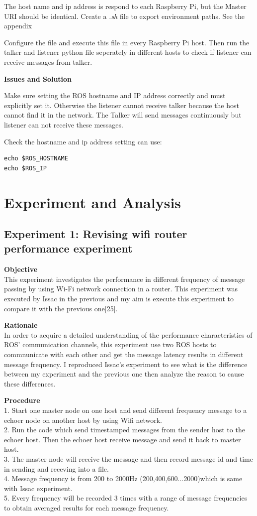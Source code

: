 \documentclass{mproj}
\begin{document}
The host name and ip address is respond to each Raspberry Pi, but the Master URI should be identical. Create a  \textit{.sh} file to export environment paths. See the appendix

Configure the file and execute this file in every Raspberry Pi host. Then run the talker and listener python file seperately in different hosts to check if listener can receive messages from talker.

\textbf{Issues and Solution}

Make sure setting the ROS hostname and IP address correctly and must explicitly set it. Otherwise the listener cannot receive talker because the host cannot find it in the network. The Talker will send messages continuously but listener can not receive these messages.

Check the hostname and ip address setting can use:
\begin{verbatim}
echo $ROS_HOSTNAME
echo $ROS_IP
\end{verbatim}

\chapter{Experiment and Analysis}

\section{Experiment 1: Revising wifi router performance experiment}
\textbf{Objective} \\
This experiment investigates the performance in different frequency of message passing by using Wi-Fi network connection in a router.  This experiment was executed by Issac in the previous and my aim is execute this experiment to compare it with the previous one[25].

\textbf{Rationale} \\
In order to acquire a detailed understanding of the performance characteristics of ROS’ communication channels, this experiment use two ROS hosts to commnunicate with each other and get the message latency results in different message frequency. I reproduced Issac's experiment to see what is the difference between my experiment and the previous one then analyze the reason to cause these differences.

\textbf{Procedure} \\
1. Start one master node on one host and send different frequency message to a echoer node on another host by using Wifi network. \\
2. Run the code which send timestamped messages from the sender host to the echoer host. Then the echoer host receive message and send it back to master host. \\
3. The master node will receive the message and then record message id and time in sending and receving into a file.  \\
4. Message frequency is from 200 to 2000Hz (200,400,600...2000)which is same with Issac experiment. \\
5. Every frequency will be recorded 3 times with a range of message frequencies to obtain averaged results for each message frequency.
\end{document}
